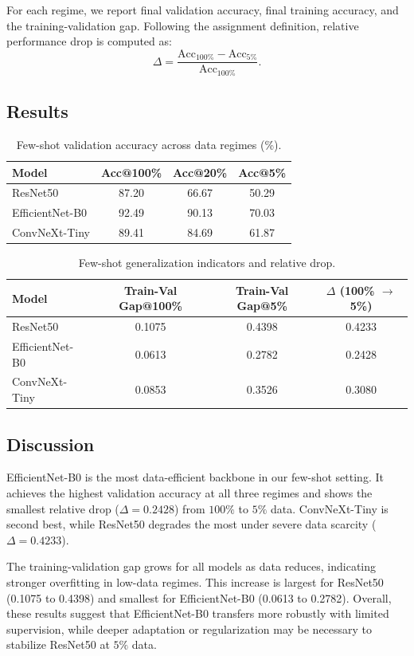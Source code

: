 \documentclass[11pt,a4paper]{article}
\begin{document}
For each regime, we report final validation accuracy, final training accuracy, and the training-validation gap. Following the assignment definition, relative performance drop is computed as:
\[
\Delta = \frac{\mathrm{Acc}_{100\%} - \mathrm{Acc}_{5\%}}{\mathrm{Acc}_{100\%}}.
\]

\subsection{Results}
\begin{table}[H]
	\centering
	\caption{Few-shot validation accuracy across data regimes (\%).}
	\begin{tabular}{lccc}
		\toprule
		Model & Acc@100\% & Acc@20\% & Acc@5\% \\
		\midrule
		ResNet50 & 87.20 & 66.67 & 50.29 \\
		EfficientNet-B0 & 92.49 & 90.13 & 70.03 \\
		ConvNeXt-Tiny & 89.41 & 84.69 & 61.87 \\
		\bottomrule
	\end{tabular}
\end{table}

\begin{table}[H]
	\centering
	\caption{Few-shot generalization indicators and relative drop.}
	\begin{tabular}{lccc}
		\toprule
		Model & Train-Val Gap@100\% & Train-Val Gap@5\% & $\Delta$ (100\% $\rightarrow$ 5\%) \\
		\midrule
		ResNet50 & 0.1075 & 0.4398 & 0.4233 \\
		EfficientNet-B0 & 0.0613 & 0.2782 & 0.2428 \\
		ConvNeXt-Tiny & 0.0853 & 0.3526 & 0.3080 \\
		\bottomrule
	\end{tabular}
\end{table}

\subsection{Discussion}
EfficientNet-B0 is the most data-efficient backbone in our few-shot setting. It achieves the highest validation accuracy at all three regimes and shows the smallest relative drop ($\Delta=0.2428$) from $100\%$ to $5\%$ data. ConvNeXt-Tiny is second best, while ResNet50 degrades the most under severe data scarcity ($\Delta=0.4233$).

The training-validation gap grows for all models as data reduces, indicating stronger overfitting in low-data regimes. This increase is largest for ResNet50 (0.1075 to 0.4398) and smallest for EfficientNet-B0 (0.0613 to 0.2782). Overall, these results suggest that EfficientNet-B0 transfers more robustly with limited supervision, while deeper adaptation or regularization may be necessary to stabilize ResNet50 at $5\%$ data.
\end{document}
